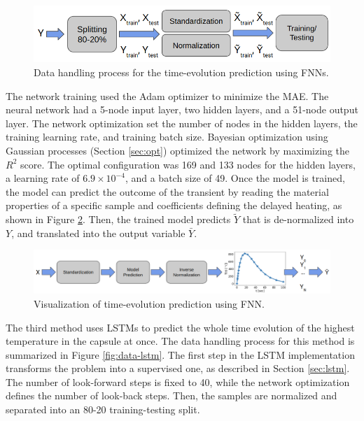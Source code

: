 \begin{figure}[htbp!] %
  \centering
  \includegraphics[width=0.7\linewidth]{figures/data-pross-fnn}
  \caption{Data handling process for the time-evolution prediction using FNNs.}
  \label{fig:data-fnn}
\end{figure}

The network training used the Adam optimizer to minimize the \gls*{MAE}.
The neural network had a 5-node input layer, two hidden layers, and a 51-node output layer.
The network optimization set the number of nodes in the hidden layers, the training learning rate, and training batch size.
Bayesian optimization using Gaussian processes (Section \ref{sec:opt}) optimized the network by maximizing the $R^2$ score.
The optimal configuration was 169 and 133 nodes for the hidden layers, a learning rate of $6.9 \times 10^{-4}$, and a batch size of 49.
Once the model is trained, the model can predict the outcome of the transient by reading the material properties of a specific sample and coefficients defining the delayed heating, as shown in Figure \ref{fig:data-reg2}.
Then, the trained model predicts $\tilde{Y}$ that is de-normalized into $Y$, and translated into the output variable $\bar{Y}$.

\begin{figure}[htbp!] %
  \centering
  \includegraphics[width=0.7\linewidth]{figures/data-prediction-fnn}
  \caption{Visualization of time-evolution prediction using FNN.}
  \label{fig:data-reg2}
\end{figure}

The third method uses LSTMs to predict the whole time evolution of the highest temperature in the capsule at once.
The data handling process for this method is summarized in Figure \ref{fig:data-lstm}.
The first step in the LSTM implementation transforms the problem into a supervised one, as described in Section \ref{sec:lstm}.
The number of look-forward steps is fixed to 40, while the network optimization defines the number of look-back steps.
Then, the samples are normalized and separated into an 80-20 training-testing split.

